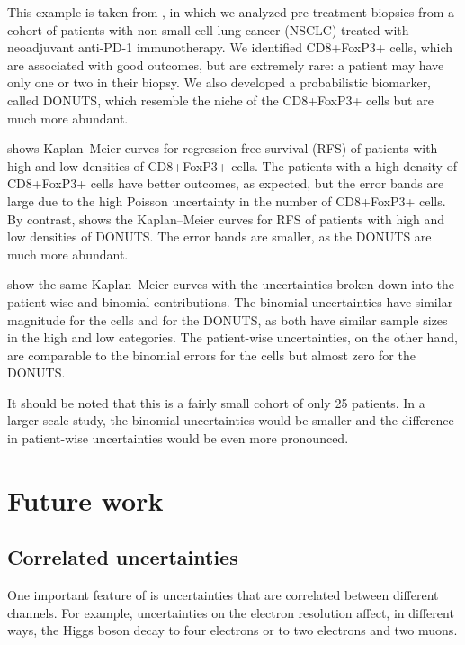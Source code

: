 \documentclass[article]{jss}
\newcommand{\KM}{Kaplan--Meier} %
\begin{document}
This example is taken from \citet{DONUTS}, in which we analyzed pre-treatment biopsies from a cohort of patients with non-small-cell lung cancer (NSCLC) treated with neoadjuvant anti-PD-1 immunotherapy. We identified CD8+FoxP3+ cells, which are associated with good outcomes, but are extremely rare: a patient may have only one or two in their biopsy. We also developed a probabilistic biomarker, called DONUTS, which resemble the niche of the CD8+FoxP3+ cells but are much more abundant.

 shows \KM{} curves for regression-free survival (RFS) of patients with high and low densities of CD8+FoxP3+ cells. The patients with a high density of CD8+FoxP3+ cells have better outcomes, as expected, but the error bands are large due to the high Poisson uncertainty in the number of CD8+FoxP3+ cells. By contrast,  shows the \KM{} curves for RFS of patients with high and low densities of DONUTS\@. The error bands are smaller, as the DONUTS are much more abundant.

 show the same \KM{} curves with the uncertainties broken down into the patient-wise and binomial contributions. The binomial uncertainties have similar magnitude for the cells and for the DONUTS, as both have similar sample sizes in the high and low categories. The patient-wise uncertainties, on the other hand, are comparable to the binomial errors for the cells but almost zero for the DONUTS\@.

It should be noted that this is a fairly small cohort of only 25 patients. In a larger-scale study, the binomial uncertainties would be smaller and the difference in patient-wise uncertainties would be even more pronounced.

\section{Future work}

\subsection{Correlated uncertainties}

One important feature of  is uncertainties that are correlated between different channels. For example, uncertainties on the electron resolution affect, in different ways, the Higgs boson decay to four electrons or to two electrons and two muons.
\end{document}
